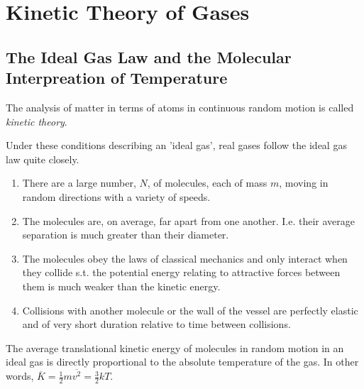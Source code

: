 \chapter{Kinetic Theory of Gases}

\section{The Ideal Gas Law and the Molecular Interpreation of Temperature}

\begin{definition}
    The analysis of matter in terms of atoms in continuous random motion is called \emph{kinetic theory}.
\end{definition}
\begin{proposition}
    Under these conditions describing an 'ideal gas', real gases follow the ideal gas law quite closely. 
    \begin{enumerate}
        \item There are a large number, $N$, of molecules, each of mass $m$, moving in random directions with a variety of speeds.
        \item The molecules are, on average, far apart from one another. I.e. their average separation is much greater than their diameter.
        \item The molecules obey the laws of classical mechanics and only interact when they collide s.t. the potential energy relating to attractive forces between them is much weaker than the kinetic energy.
        \item Collisions with another molecule or the wall of the vessel are perfectly elastic and of very short duration relative to time between collisions.
    \end{enumerate}
\end{proposition}
\begin{proposition}
    The average translational kinetic energy of molecules in random motion in an ideal gas is directly proportional to the absolute temperature of the gas. In other words, $\overline{K} = \frac{1}{2}m\overline{v^2} = \frac{3}{2}kT$.
\end{proposition}

